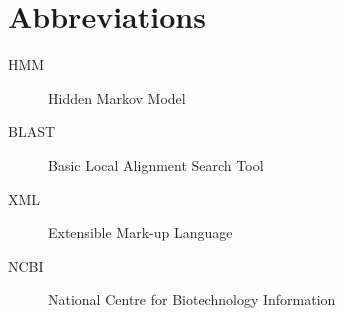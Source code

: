 \chapter*{Abbreviations}\label{abbr}
\begin{description}
	\item[HMM] Hidden Markov Model
	\item[BLAST] Basic Local Alignment Search Tool
	\item[XML] Extensible Mark-up Language
	\item[NCBI] National Centre for Biotechnology Information
\end{description}
